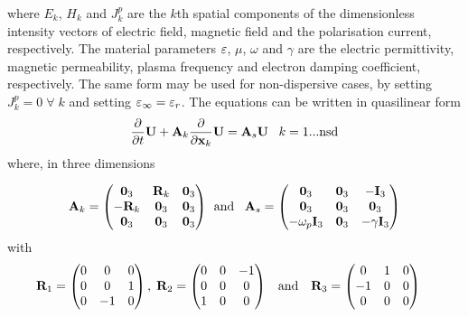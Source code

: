 where $E_k$, $H_k$ and $J^p_k$ are the $k$th spatial components of the
dimensionless intensity vectors of electric field, magnetic field and the
polarisation current, respectively. The material parameters $\varepsilon$, $\mu$,
$\omega$ and $\gamma$ are the electric permittivity, magnetic permeability,
plasma frequency and electron damping coefficient, respectively. The same form
may be used for non-dispersive cases, by setting $J^p_k = 0 \; \forall \; k$ and
setting $\varepsilon_{\infty} = \varepsilon_{r}$. The equations can be written in quasilinear form
\begin{equation}
  \label{eq:1}
  \frac{\partial}{\partial t} \mathbf{U}  + \mathbf{A}_k\frac{\partial}{\partial\mathbf{x}_k}{\mathbf{U}} = \mathbf{A}_s \mathbf{U}  \;\;\;k = 1...\textrm{nsd}
\end{equation}
where, in three dimensions

\begin{align}
\mathbf{A}_k = 
    \begin{pmatrix}
      \mathbf{0}_3 & \mathbf{R}_{k} & \mathbf{0}_3 \\
      -\mathbf{R}_{k} & \mathbf{0}_3 & \mathbf{0}_3 \\
      \mathbf{0}_3 & \mathbf{0}_3 & \mathbf{0}_3 \\
    \end{pmatrix}
  \: \:
\textrm{and}\;\;\;
\mathbf{A}_s = 
    \begin{pmatrix}
      \mathbf{0}_3  & \mathbf{0}_3 & -\mathbf{I}_3\\
      \mathbf{0}_3 & \mathbf{0}_3 & \mathbf{0}_3 \\
      -\omega_p \mathbf{I}_3 & \mathbf{0}_3 & - \gamma \mathbf{I}_3 \\
    \end{pmatrix}
\end{align}
with
\begin{align}
\mathbf{R}_1 = 
    \begin{pmatrix}
      0 & 0 & 0 \\
      0 & 0 & 1 \\
      0 & -1 & 0 \\
    \end{pmatrix} ,
  \: \:
  &
\mathbf{R}_2 = 
    \begin{pmatrix}
      0 & 0 & -1 \\
      0 & 0 & 0 \\
      1 & 0 & 0 \\
    \end{pmatrix}
  &
  \textrm{and   } \:\:\:
  &
\mathbf{R}_3 = 
    \begin{pmatrix}
      0 & 1 & 0 \\
      -1 & 0 & 0 \\
      0 & 0 & 0 \\
    \end{pmatrix}
  &
\end{align}

